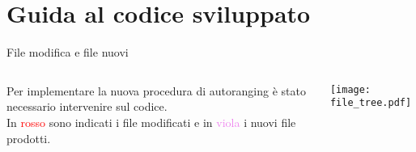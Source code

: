 \section{Guida al codice sviluppato}
\begin{frame}{File modifica e file nuovi}
  \begin{columns}
    \begin{column}{0.7\textwidth}
      Per implementare la \alert{nuova} procedura di autoranging
      è stato necessario intervenire sul codice.\\
      In \textcolor{red}{rosso} sono indicati i file modificati e in
      \textcolor{violet}{viola} i nuovi file prodotti.
    \end{column}
    \begin{column}{0.3\textwidth}
      \centering
      \texttt{[image: file\_tree.pdf]}
    \end{column}
  \end{columns}

\end{frame}
